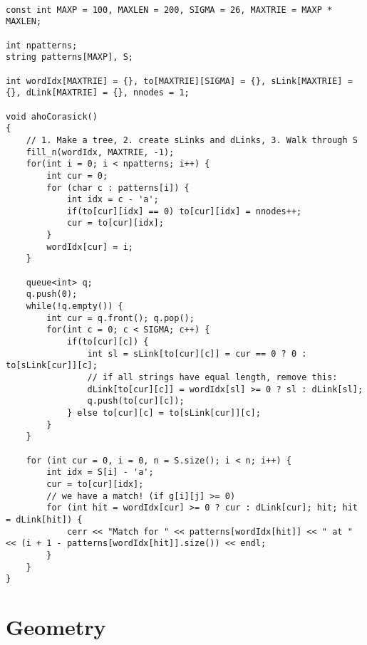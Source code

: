 \documentclass{article}
\begin{document}
\begin{lstlisting}

const int MAXP = 100, MAXLEN = 200, SIGMA = 26, MAXTRIE = MAXP * MAXLEN;

int npatterns;
string patterns[MAXP], S;

int wordIdx[MAXTRIE] = {}, to[MAXTRIE][SIGMA] = {}, sLink[MAXTRIE] = {}, dLink[MAXTRIE] = {}, nnodes = 1;

void ahoCorasick()
{
    // 1. Make a tree, 2. create sLinks and dLinks, 3. Walk through S
    fill_n(wordIdx, MAXTRIE, -1);
    for(int i = 0; i < npatterns; i++) {
        int cur = 0;
        for (char c : patterns[i]) {
            int idx = c - 'a';
            if(to[cur][idx] == 0) to[cur][idx] = nnodes++;
            cur = to[cur][idx];
        }
        wordIdx[cur] = i;
    }

    queue<int> q;
    q.push(0);
    while(!q.empty()) {
        int cur = q.front(); q.pop();
        for(int c = 0; c < SIGMA; c++) {
            if(to[cur][c]) {
                int sl = sLink[to[cur][c]] = cur == 0 ? 0 : to[sLink[cur]][c];
                // if all strings have equal length, remove this:
                dLink[to[cur][c]] = wordIdx[sl] >= 0 ? sl : dLink[sl];
                q.push(to[cur][c]);
            } else to[cur][c] = to[sLink[cur]][c];
        }
    }

    for (int cur = 0, i = 0, n = S.size(); i < n; i++) {
        int idx = S[i] - 'a';
        cur = to[cur][idx];
        // we have a match! (if g[i][j] >= 0)
        for (int hit = wordIdx[cur] >= 0 ? cur : dLink[cur]; hit; hit = dLink[hit]) {
            cerr << "Match for " << patterns[wordIdx[hit]] << " at " << (i + 1 - patterns[wordIdx[hit]].size()) << endl;
        }
    }
}

\end{lstlisting}

\section{Geometry}
\end{document}
